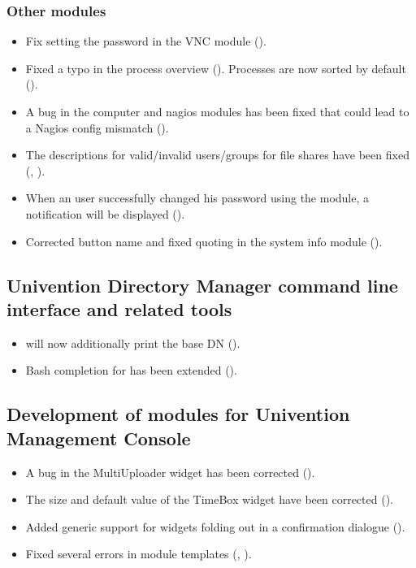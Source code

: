 \subsubsection{Other modules}
\begin{itemize}
\item Fix setting the password in the VNC module ().
\item Fixed a typo in the process overview (). Processes
  are now sorted by default ().
\item A bug in the computer and nagios modules has been fixed that
  could lead to a Nagios config mismatch ().
\item The descriptions for valid/invalid users/groups for file shares
  have been fixed (, ).
\item When an user successfully changed his password using the
   module, a notification will be
  displayed ().
\item Corrected button name and fixed quoting in the system info module ().
\end{itemize}

\subsection{Univention Directory Manager command line interface and related tools}
\begin{itemize}
\item {} will now additionally print
  the base DN ().

\item Bash completion for  has been extended ().
\end{itemize}

\subsection{Development of modules for Univention Management Console}
\begin{itemize}
\item A bug in the MultiUploader widget has been corrected ().
\item The size and default value of the TimeBox widget have been corrected ().
\item Added generic support for widgets folding out in a confirmation dialogue
  ().
\item Fixed several errors in module templates (, ).
\end{itemize}


